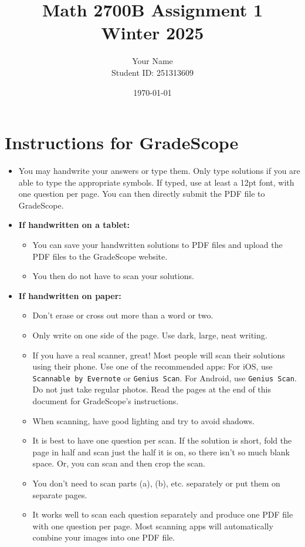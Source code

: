 \documentclass[12pt]{article}
\title{Math 2700B Assignment 1 \\ Winter 2025}
\author{Your Name \\ Student ID: 251313609}
\date{\today}
\begin{document}
\maketitle

\section*{Instructions for GradeScope}

\begin{itemize}
    \item You may handwrite your answers or type them. Only type solutions if you are able to type the appropriate symbols. If typed, use at least a 12pt font, with one question per page. You can then directly submit the PDF file to GradeScope.
    \item \textbf{If handwritten on a tablet:}
    \begin{itemize}
        \item You can save your handwritten solutions to PDF files and upload the PDF files to the GradeScope website.
        \item You then do not have to scan your solutions.
    \end{itemize}
    \item \textbf{If handwritten on paper:}
    \begin{itemize}
        \item Don’t erase or cross out more than a word or two.
        \item Only write on one side of the page. Use dark, large, neat writing.
        \item If you have a real scanner, great! Most people will scan their solutions using their phone. Use one of the recommended apps: For iOS, use \texttt{Scannable by Evernote} or \texttt{Genius Scan}. For Android, use \texttt{Genius Scan}. Do not just take regular photos. Read the pages at the end of this document for GradeScope’s instructions.
        \item When scanning, have good lighting and try to avoid shadows.
        \item It is best to have one question per scan. If the solution is short, fold the page in half and scan just the half it is on, so there isn’t so much blank space. Or, you can scan and then crop the scan.
        \item You don’t need to scan parts (a), (b), etc. separately or put them on separate pages.
        \item It works well to scan each question separately and produce one PDF file with one question per page. Most scanning apps will automatically combine your images into one PDF file.

\end{itemize}
\end{itemize}
\end{document}
